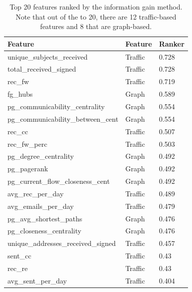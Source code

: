 \documentclass{article}
\begin{document}
\begin{itemize}
\begin{table}[H]
\centering
\caption{Top 20 features ranked by the information gain method.  Note that out of the to 20, there are 12 traffic-based features and 8 that are graph-based.}
\label{tab:ranked_feats}
\begin{tabular}{|l|l|l|}
\hline
Feature                                      & Feature      & Ranker \\\hline
unique\_subjects\_received                   & Traffic      & 0.728  \\
total\_received\_signed                      & Traffic      & 0.728  \\
rec\_fw                                      & Traffic      & 0.719  \\
fg\_hubs                                     & Graph        & 0.589  \\
pg\_communicability\_centrality              & Graph        & 0.554  \\
pg\_communicability\_between\_cent           & Graph        & 0.554  \\
rec\_cc                                      & Traffic      & 0.507  \\
rec\_fw\_perc                                & Traffic      & 0.503  \\
pg\_degree\_centrality                       & Graph        & 0.492  \\
pg\_pagerank                                 & Graph        & 0.492  \\
pg\_current\_flow\_closeness\_cent           & Graph        & 0.492  \\
avg\_rec\_per\_day                           & Traffic      & 0.489  \\
avg\_emails\_per\_day                        & Traffic      & 0.479  \\
pg\_avg\_shortest\_paths                     & Graph        & 0.476  \\
pg\_closeness\_centrality                    & Graph        & 0.476  \\
unique\_addresses\_received\_signed          & Traffic      & 0.457  \\
sent\_cc                                     & Traffic      & 0.43   \\
rec\_re                                      & Traffic      & 0.43   \\
avg\_sent\_per\_day                          & Traffic      & 0.404  \\ \hline
\end{tabular}
\end{table}


\end{itemize}
\end{document}

